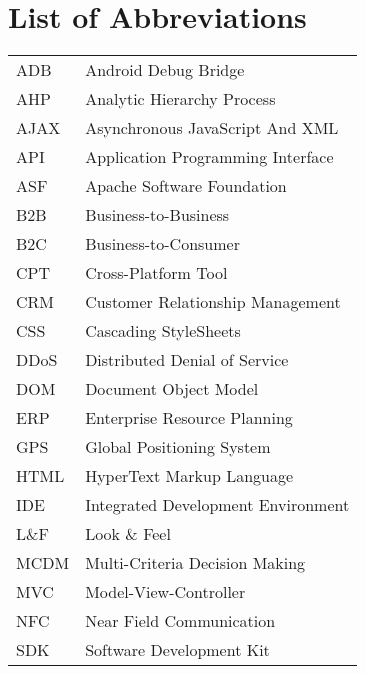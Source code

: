 \documentclass[master=cws,masteroption=se,english,a4paper,oneside]{kulemt}
\begin{document}
\chapter{List of Abbreviations}
\begin{flushleft}
  \renewcommand{\arraystretch}{1.1}
  \begin{tabularx}{\textwidth}{@{}p{12mm}X@{}}
    ADB & Android Debug Bridge \\
    AHP & Analytic Hierarchy Process \\
    AJAX & Asynchronous JavaScript And XML \\
    API & Application Programming Interface \\
    ASF & Apache Software Foundation \\
    B2B & Business-to-Business \\
    B2C & Business-to-Consumer \\
    CPT   & Cross-Platform Tool \\
    CRM & Customer Relationship Management \\
    CSS & Cascading StyleSheets \\
    DDoS & Distributed Denial of Service \\
    DOM & Document Object Model \\
    ERP & Enterprise Resource Planning \\
    GPS & Global Positioning System \\
    HTML & HyperText Markup Language \\
    IDE & Integrated Development Environment \\
    L\&F & Look \& Feel \\
    MCDM & Multi-Criteria Decision Making \\
    MVC & Model-View-Controller \\
    NFC & Near Field Communication \\
    SDK & Software Development Kit
  \end{tabularx}
\end{flushleft}

\mainmatter







%
%
%

\appendixpage*

\appendix
\end{document}
